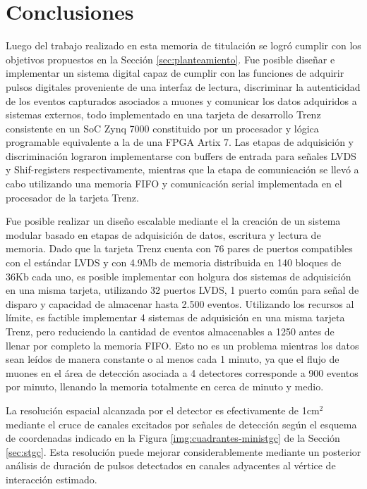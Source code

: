 \section{Conclusiones}
\label{sec:conc}

Luego del trabajo realizado en esta memoria de titulación se logró cumplir con los objetivos propuestos en la Sección \ref{sec:planteamiento}. Fue posible diseñar e implementar un sistema digital capaz de cumplir con las funciones de adquirir pulsos digitales proveniente de una interfaz de lectura, discriminar la autenticidad de los eventos capturados asociados a muones y comunicar los datos adquiridos a sistemas externos, todo implementado en una tarjeta de desarrollo Trenz consistente en un SoC Zynq 7000 constituido por un procesador y lógica programable equivalente a la de una FPGA Artix 7. Las etapas de adquisición y discriminación lograron implementarse con buffers de entrada para señales LVDS y Shif-registers respectivamente, mientras que la etapa de comunicación se llevó a cabo utilizando una memoria FIFO y comunicación serial implementada en el procesador de la tarjeta Trenz.

Fue posible realizar un diseño escalable mediante el la creación de un sistema modular basado en etapas de adquisición de datos, escritura y lectura de memoria. Dado que la tarjeta Trenz cuenta con 76 pares de puertos compatibles con el estándar LVDS y con 4.9Mb de memoria distribuida en 140 bloques de 36Kb cada uno, es posible implementar con holgura dos sistemas de adquisición en una misma tarjeta, utilizando 32 puertos LVDS, 1 puerto común para señal de disparo y capacidad de almacenar hasta 2.500 eventos. Utilizando los recursos al límite, es factible implementar 4 sistemas de adquisición en una misma tarjeta Trenz, pero reduciendo la cantidad de eventos almacenables a 1250 antes de llenar por completo la memoria FIFO. Esto no es un problema mientras los datos sean leídos de manera constante o al menos cada 1 minuto, ya que el flujo de muones en el área de detección asociada a 4 detectores corresponde a 900 eventos por minuto, llenando la memoria totalmente en cerca de minuto y medio.

La resolución espacial alcanzada por el detector es efectivamente de 1cm$^2$ mediante el cruce de canales excitados por señales de detección según el esquema de coordenadas indicado en la Figura \ref{img:cuadrantes-ministgc} de la Sección \ref{sec:stgc}. Esta resolución puede mejorar considerablemente mediante un posterior análisis de duración de pulsos detectados en canales adyacentes al vértice de interacción estimado. 

